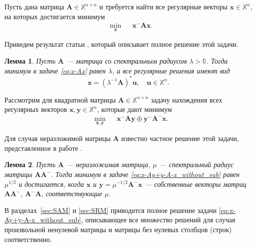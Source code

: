 \documentclass[specialist,
               substylefile = spbu.rtx,
               subf,href,colorlinks=true, 12pt]{disser}
\newtheorem{lemma}{Лемма}
\theoremstyle{definition}
\begin{document}
Пусть дана матрица $\bm{A}\in\mathbb{X}^{n\times n}$ и требуется найти все регулярные векторы $\bm{x}\in\mathbb{X}^{n}$, на которых достигается минимум
\begin{equation}\label{eq:x-Ax}
\begin{aligned}
&
\min_{\bm{x}}
&&\bm{x}^{-}\bm{A}\bm{x}.
\end{aligned}
\end{equation}

Приведем результат статьи \cite{Krivulin2015Extremal}, который описывает полное решение этой задачи.
\begin{lemma}\label{lem:x-Ax_without_sub}
Пусть $\bm{A}$ --- матрица со спектральным радиусом $\lambda>\mathbb{0}$. Тогда минимум в задаче \eqref{eq:x-Ax} равен
 $\lambda$, а все регулярные решения имеют вид
\begin{equation*}
\bm{x}=(\lambda^{-1}\bm{A})^{\ast}\bm{u},
\quad
\bm{u}\in\mathbb{X}^{n}.
\end{equation*}
\end{lemma}

Рассмотрим для квадратной матрицы $\bm{A}\in\mathbb{X}^{n\times n}$ задачу нахождения всех регулярных векторов $\bm{x},\bm{y}\in\mathbb{X}^{n}$, которые дают минимум
\begin{equation}\label{eq:x-Ay+y-A-x_without_sub}
\begin{aligned}
&
\min_{\bm{x},\bm{y}}
&&\bm{x}^{-}\bm{A}\bm{y}
\oplus
\bm{y}^{-}\bm{A}^{-}\bm{x}.
\end{aligned}
\end{equation}

Для случая неразложимой матрицы $\bm{A}$ известно частное решение этой задачи, представленное в работе \cite{Krivulin2009Methods}.
\begin{lemma}\label{lem:part_sol}
Пусть $\bm{A}$ --- неразложимая матрица, $\mu$ --- спектральный радиус матрицы $\bm{A}\bm{A}^{-}$. Тогда минимум в задаче \eqref{eq:x-Ay+y-A-x_without_sub} равен $\mu^{1/2}$ и достигается, когда $\bm{x}$ и $\bm{y}=\mu^{-1/2}\bm{A}^{-}\bm{x}$ --- собственные векторы матриц $\bm{A}\bm{A}^{-}$, $\bm{A}^{-}\bm{A}$, соответствующие $\mu$.
\end{lemma}

В разделах~\ref{sec:SAM} и \ref{sec:SRM} приводится полное решение задачи \eqref{eq:x-Ay+y-A-x_without_sub}, описывающее все множество решений для случая произвольной ненулевой матрицы и матрицы без нулевых столбцов (строк) соответственно.
\end{document}
